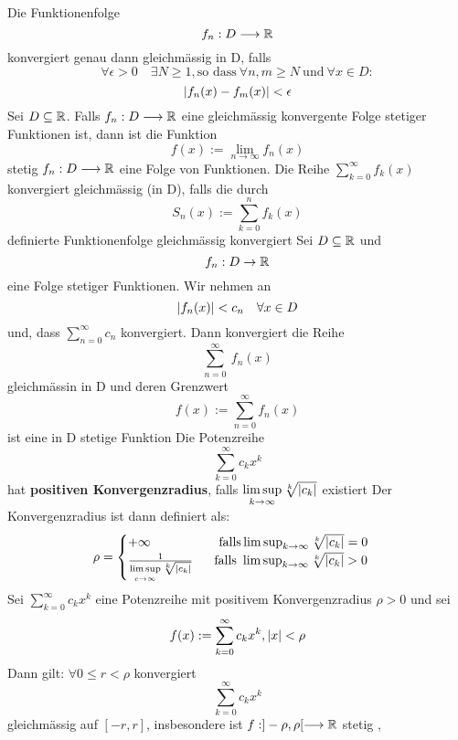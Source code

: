 \Korollar[3.35] Die Funktionenfolge
\[f_n : D \longrightarrow \mathbb{R} \]
konvergiert genau dann gleichmässig in D, falls
\[\forall \epsilon > 0 \quad \exists N \geq 1 , \text{so dass} \  \forall n,m \geq N \ \text{und} \ \forall x \in D:\]  \newline
\[ \left\lvert f_n(x) - f_m(x) \right\rvert < \epsilon \]
\Korollar[3.36] Sei \(D \subseteq \mathbb{R}\). Falls \(f_n : D \longrightarrow \mathbb{R} \) eine gleichmässig konvergente Folge stetiger Funktionen ist, dann ist die Funktion
\[f(x) := \lim\limits_{n \rightarrow \infty} f_n(x)\] stetig \newline
\Def[3.37] \(f_n: D \longrightarrow \mathbb{R}\) eine Folge von Funktionen. Die Reihe \(\sum_{k=0}^\infty f_k(x)\) konvergiert gleichmässig (in D), falls die durch
\[S_n(x) := \sum_{k=0}^{n}f_k(x)\] definierte Funktionenfolge gleichmässig konvergiert
\Satz[3.38] Sei \(D \subseteq \mathbb{R} \) und
\[f_n : D \rightarrow \mathbb{R} \]
eine Folge stetiger Funktionen. Wir nehmen an
\[\left\lvert f_n(x) \right\rvert < c_n \quad \forall x \in D \]
und, dass \(\sum_{n=0}^\infty c_n\) konvergiert. Dann konvergiert die Reihe
\[\sum_{n=0}^\infty\ f_n(x)\]
gleichmässin in D und deren Grenzwert
\[f(x) := \sum_{n=0}^{\infty} f_n(x)\]
ist eine in D stetige Funktion \newline
\Def[3.39] Die Potenzreihe
\[\sum_{k=0}^\infty c_kx^k\]
hat \textbf{positiven Konvergenzradius}, falls \(\limsup\limits_{k \rightarrow \infty} \sqrt[k]{\left\lvert c_k \right\rvert}\) existiert
Der Konvergenzradius ist dann definiert als:
\[\rho = \begin{cases}
    +\infty \quad \quad \quad \quad \quad \  \text{falls} \limsup_{k \rightarrow \infty} \sqrt[k]{\left\lvert c_k \right\rvert} = 0 \\
    \frac{1}{\limsup\limits_{c \rightarrow \infty} \sqrt[k]{\left|c_{k}\right|}}  \quad \  \ \text{falls } \limsup_{k \rightarrow \infty} \sqrt[k]{\left\lvert c_k \right\rvert} > 0
    \end{cases}\]
\newline
\Satz[3.40] Sei \(\sum_{k=0}^\infty c_kx^k \) eine Potenzreihe mit positivem Konvergenzradius \(\rho > 0\) und sei 
\[f(x) := \sum_{k=0}^\infty c_kx^k, \left\lvert x \right\rvert < \rho \]
Dann gilt: \(\forall 0 \leq r < \rho \) konvergiert
\[\sum_{k=0}^\infty c_kx^k \]
gleichmässig auf \([-r,r]\), insbesondere ist \newline \(f: ] -\rho,\rho [ \longrightarrow \mathbb{R}\) stetig \newline
\sep
